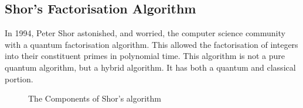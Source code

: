 \subsection{Shor's Factorisation Algorithm}
\label{sec:shorsalg}
In 1994, Peter Shor astonished, and worried, the computer science community with a quantum factorisation algorithm\cite{Shor:1994jg}.
This allowed the factorisation of integers into their constituent primes in polynomial time.
This algorithm is not a pure quantum algorithm, but a hybrid algorithm.
It has both a quantum and classical portion.

\begin{figure}
\caption{The Components of Shor's algorithm}
\end{figure}

